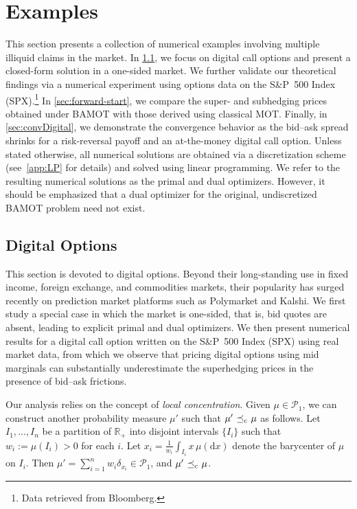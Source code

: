 \documentclass[11pt]{article}
\newcommand{\cP}{\mathcal{P}}
\newcommand{\R}{\mathbb{R}} %
\theoremstyle{plain}
\theoremstyle{definition}
\theoremstyle{remark}
\newcommand*{\rd}{\mathrm{d}}
\DeclareMathOperator{\cleq}{\,\preceq_{\rm c}\,}
\theoremstyle{plain}
\begin{document}
\section{Examples}\label{sec:numerics}

This section presents a collection of numerical examples involving multiple illiquid claims in the market. In \cref{sec:digital_options}, we focus on digital call options and present a closed-form solution in a one-sided market. We further validate our theoretical findings via a numerical experiment using options data on the S\&P~500 Index (SPX).\footnote{Data retrieved from Bloomberg.}
In \cref{sec:forward-start}, we compare the super- and subhedging prices obtained under BAMOT with those derived using classical MOT. Finally, in \cref{sec:convDigital}, we demonstrate the convergence behavior as the bid--ask spread shrinks for a risk-reversal payoff and an at-the-money digital call option.  Unless stated otherwise, all numerical solutions are obtained via a discretization scheme (see~\cref{app:LP} for details) and solved using linear programming. We refer to the resulting numerical solutions as the primal and dual optimizers. However, it should be emphasized that a dual optimizer for the original, undiscretized BAMOT problem need not exist.

\subsection{Digital Options}\label{sec:digital_options}

This section is devoted to digital options. Beyond their long-standing use in fixed income, foreign exchange, and commodities markets, their popularity has surged recently on prediction market platforms such as Polymarket and Kalshi. We first study a special case in which the market is one-sided, that is, bid quotes are absent, leading to explicit primal and dual optimizers. We then present numerical results for a digital call option written on the S\&P~500 Index (SPX) using real market data, from which we observe that pricing digital options using mid marginals can substantially underestimate the superhedging prices in the presence of bid--ask frictions.
%

Our analysis relies on the concept of \emph{local concentration}. Given $\mu \in \cP_1$, we can construct another probability measure $\mu'$ such that $\mu' \cleq \mu$ as follows. Let $I_1,\ldots,I_n$ be a partition of $\R_+$ into disjoint intervals $\{I_i\}$ such that $w_i := \mu(I_i) > 0$ for each $i$. Let $x_i = \frac{1}{w_i}\int_{I_i} x \, \mu(\rd x)$ denote the barycenter of $\mu$ on $I_i$. Then $\mu' = \sum_{i=1}^n w_i \delta_{x_i} \in \cP_1$, and $\mu' \cleq \mu$.
%
\end{document}
